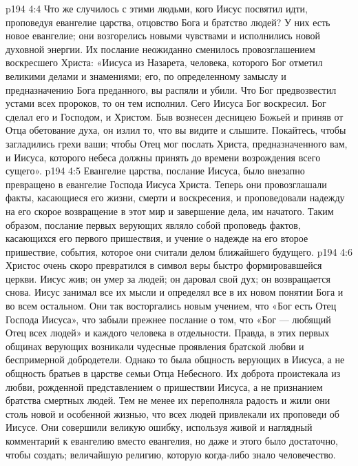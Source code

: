 \vs p194 4:4 \pc Что же случилось с этими людьми, кого Иисус посвятил идти, проповедуя евангелие царства, отцовство Бога и братство людей? У них есть новое евангелие; они возгорелись новыми чувствами и исполнились новой духовной энергии. Их послание неожиданно сменилось провозглашением воскресшего Христа: «Иисуса из Назарета, человека, которого Бог отметил великими делами и знамениями; его, по определенному замыслу и предназначению Бога преданного, вы распяли и убили. Что Бог предвозвестил устами всех пророков, то он тем исполнил. Сего Иисуса Бог воскресил. Бог сделал его и Господом, и Христом. Быв вознесен десницею Божьей и приняв от Отца обетование духа, он излил то, что вы видите и слышите. Покайтесь, чтобы загладились грехи ваши; чтобы Отец мог послать Христа, предназначенного вам, и Иисуса, которого небеса должны принять до времени возрождения всего сущего».
\vs p194 4:5 Евангелие царства, послание Иисуса, было внезапно превращено в евангелие Господа Иисуса Христа. Теперь они провозглашали факты, касающиеся его жизни, смерти и воскресения, и проповедовали надежду на его скорое возвращение в этот мир и завершение дела, им начатого. Таким образом, послание первых верующих являло собой проповедь фактов, касающихся его первого пришествия, и учение о надежде на его второе пришествие, события, которое они считали делом ближайшего будущего.
\vs p194 4:6 Христос очень скоро превратился в символ веры быстро формировавшейся церкви. Иисус жив; он умер за людей; он даровал свой дух; он возвращается снова. Иисус занимал все их мысли и определял все в их новом понятии Бога и во всем остальном. Они так восторгались новым учением, что «Бог есть Отец Господа Иисуса», что забыли прежнее послание о том, что «Бог --- любящий Отец всех людей» и каждого человека в отдельности. Правда, в этих первых общинах верующих возникали чудесные проявления братской любви и беспримерной добродетели. Однако то была общность верующих в Иисуса, а не общность братьев в царстве семьи Отца Небесного. Их доброта проистекала из любви, рожденной представлением о пришествии Иисуса, а не признанием братства смертных людей. Тем не менее их переполняла радость и жили они столь новой и особенной жизнью, что всех людей привлекали их проповеди об Иисусе. Они совершили великую ошибку, используя живой и наглядный комментарий к евангелию вместо евангелия, но даже и этого было достаточно, чтобы создать; величайшую религию, которую когда\hyp{}либо знало человечество.
